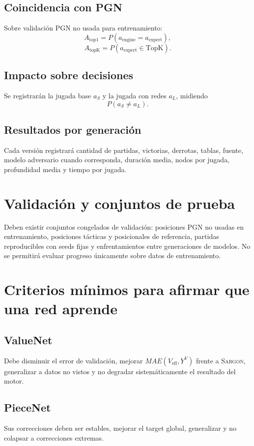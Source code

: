\documentclass[11pt,a4paper]{article}
\newcommand{\Sargon}{\textsc{Sargon}}
\begin{document}
\subsection{Coincidencia con PGN}
Sobre validación PGN no usada para entrenamiento:
\[
A_{\mathrm{top1}}=P(a_{\mathrm{engine}}=a_{\mathrm{expert}}),
\]
\[
A_{\mathrm{topK}}=P(a_{\mathrm{expert}}\in\mathrm{TopK}).
\]

\subsection{Impacto sobre decisiones}
Se registrarán la jugada base $a_S$ y la jugada con redes $a_L$, midiendo
\[
P(a_S\ne a_L).
\]

\subsection{Resultados por generación}
Cada versión registrará cantidad de partidas, victorias, derrotas, tablas, fuente, modelo adversario cuando corresponda, duración media, nodos por jugada, profundidad media y tiempo por jugada.

\section{Validación y conjuntos de prueba}
Deben existir conjuntos congelados de validación: posiciones PGN no usadas en entrenamiento, posiciones tácticas y posicionales de referencia, partidas reproducibles con seeds fijas y enfrentamientos entre generaciones de modelos. No se permitirá evaluar progreso únicamente sobre datos de entrenamiento.

\section{Criterios mínimos para afirmar que una red aprende}
\subsection{ValueNet}
Debe disminuir el error de validación, mejorar $MAE(V_{\mathrm{eff}},Y^V)$ frente a \Sargon{}, generalizar a datos no vistos y no degradar sistemáticamente el resultado del motor.

\subsection{PieceNet}
Sus correcciones deben ser estables, mejorar el target global, generalizar y no colapsar a correcciones extremas.
\end{document}
